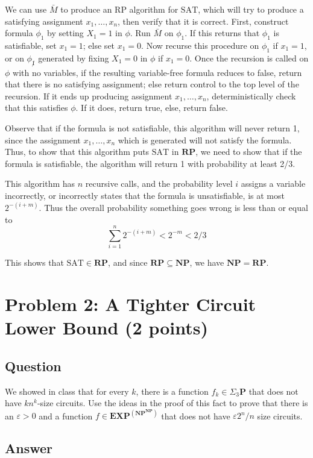 \documentclass{article}
\renewcommand{\P}{\mathbf{P}}
\newcommand{\NP}{\mathbf{NP}}
\newcommand{\EXP}{\mathbf{EXP}}
\newcommand{\RP}{\mathbf{RP}}
\def \eps {{\varepsilon}}
\begin{document}
We can use $\bar{M}$ to produce an RP algorithm for $\text{SAT}$, which will try to produce a satisfying assignment $x_1, \dots, x_n$, then verify that it is correct.
First, construct formula $\phi_1$ by setting $X_1 = 1$ in $\phi$.  Run $\bar{M}$ on $\phi_1$.
If this returns that $\phi_1$ is satisfiable, set $x_1 = 1$; else set $x_1 = 0$.
Now recurse this procedure on $\phi_1$ if $x_1 = 1$, or on $\phi_{\not 1}$ generated by
fixing $X_1 = 0$ in $\phi$ if $x_1 = 0$.
Once the recursion is called on $\phi$ with no variables, if
the resulting variable-free formula reduces to false, return that there is no satisfying
assignment; else return control to the top level of the recursion.
If it ends up producing assignment $x_1, \dots, x_n$, deterministically check that this satisfies $\phi$.  If it does, return true, else, return false.

Observe that if the formula is not satisfiable, this algorithm will never return 1, since the assignment $x_1, \dots, x_n$ which is generated will not satisfy the formula.
Thus, to show that this algorithm puts $\text{SAT}$ in $\RP$, we need to show that if the formula is satisfiable, the algorithm will return 1 with probability at least 2/3.

This algorithm has $n$ recursive calls, and the probability level $i$ assigns a variable incorrectly, or incorrectly states that the formula is unsatisfiable, is at most $2^{-(i + m)}$.
Thus the overall probability something goes wrong is less than or equal to
$$
\sum_{i=1}^n{2^{-(i + m)}} < 2^{-m} < 2/3
$$

This shows that $\text{SAT} \in \RP$, and since $\RP \subseteq \NP$, we have $\NP = \RP$.


\newpage
\section*{Problem 2: A Tighter Circuit Lower Bound (2 points)}

\subsection*{Question}

We showed in class that for every $k$, there is a function $f_k \in \Sigma_3 \P$ that does not have $k n^k$-size circuits. Use the ideas in the proof of this fact to prove that there is an $\eps > 0$ and a function $f \in \EXP^{(\NP^{\NP})}$ that does not have $\eps 2^n/n$ size circuits.

\subsection*{Answer}
\end{document}
